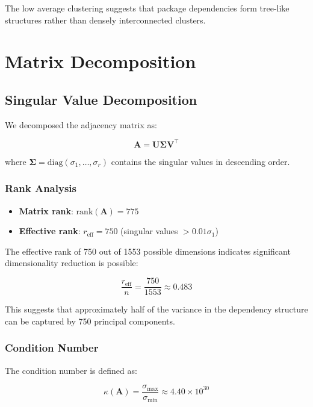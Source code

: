 \documentclass[11pt,a4paper]{article}
\begin{document}
The low average clustering suggests that package dependencies form tree-like structures rather than densely interconnected clusters.

\section{Matrix Decomposition}

\subsection{Singular Value Decomposition}

We decomposed the adjacency matrix as:

\begin{equation}
\mathbf{A} = \mathbf{U}\mathbf{\Sigma}\mathbf{V}^\top
\end{equation}

where $\mathbf{\Sigma} = \text{diag}(\sigma_1, \ldots, \sigma_r)$ contains the singular values in descending order.

\subsubsection{Rank Analysis}

\begin{itemize}
\item \textbf{Matrix rank}: $\text{rank}(\mathbf{A}) = 775$
\item \textbf{Effective rank}: $r_{\text{eff}} = 750$ (singular values $> 0.01\sigma_1$)
\end{itemize}

The effective rank of 750 out of 1553 possible dimensions indicates significant dimensionality reduction is possible:

\begin{equation}
\frac{r_{\text{eff}}}{n} = \frac{750}{1553} \approx 0.483
\end{equation}

This suggests that approximately half of the variance in the dependency structure can be captured by 750 principal components.

\subsubsection{Condition Number}

The condition number is defined as:

\begin{equation}
\kappa(\mathbf{A}) = \frac{\sigma_{\max}}{\sigma_{\min}} \approx 4.40 \times 10^{30}
\end{equation}
\end{document}
